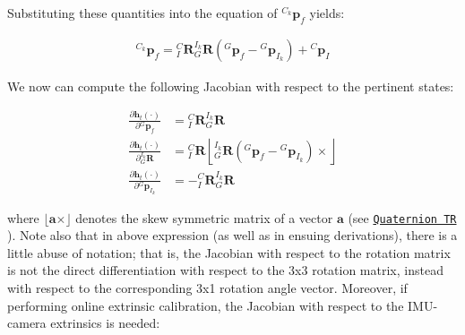 Substituting these quantities into the equation of $ {}^{C_k}\mathbf{p}_f$ yields\+:

\begin{align*} {}^{C_k}\mathbf{p}_f = {}^{C}_{I}\mathbf{R}{}^{I_k}_{G}\mathbf{R}({}^{G}\mathbf{p}_f-{}^{G}\mathbf{p}_{I_k}) +{}^{C}\mathbf{p}_I \end{align*}

We now can compute the following Jacobian with respect to the pertinent states\+:

\begin{align*} \frac{\partial \mathbf h_t (\cdot)}{\partial {}^{G}\mathbf{p}_f} &= {}^{C}_{I}\mathbf{R}{}^{I_k}_{G}\mathbf{R} \\ \frac{\partial \mathbf h_t (\cdot)}{\partial {}^{I_k}_{G}\mathbf{R}} &= {}^{C}_{I}\mathbf{R} \left\lfloor {}^{I_k}_{G}\mathbf{R}({}^{G}\mathbf{p}_f-{}^{G}\mathbf{p}_{I_k}) \times\right\rfloor \\ \frac{\partial \mathbf h_t (\cdot)}{\partial {}^{G}\mathbf{p}_{I_k}} &= -{}^{C}_{I}\mathbf{R}{}^{I_k}_{G}\mathbf{R} \end{align*}

where $\lfloor \mathbf a\times \rfloor $ denotes the skew symmetric matrix of a vector $\mathbf a$ (see \href{http://mars.cs.umn.edu/tr/reports/Trawny05b.pdf}{\tt Quaternion TR} \cite{Trawny2005TR}). Note also that in above expression (as well as in ensuing derivations), there is a little abuse of notation; that is, the Jacobian with respect to the rotation matrix is not the direct differentiation with respect to the 3x3 rotation matrix, instead with respect to the corresponding 3x1 rotation angle vector. Moreover, if performing online extrinsic calibration, the Jacobian with respect to the I\+M\+U-\/camera extrinsics is needed\+:

